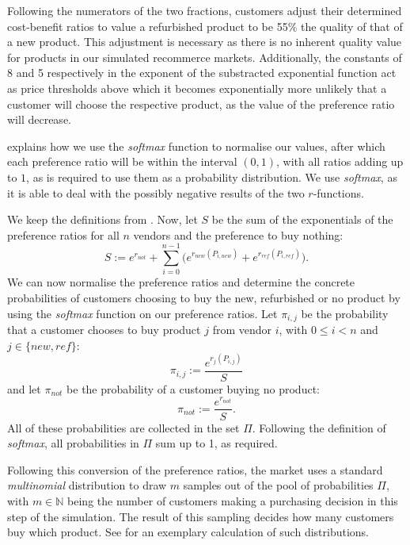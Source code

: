 Following the numerators of the two fractions, customers adjust their determined cost-benefit ratios to value a refurbished product to be 55\% the quality of that of a new product. This adjustment is necessary as there is no inherent quality value for products in our simulated recommerce markets. Additionally, the constants of 8 and 5 respectively in the exponent of the substracted exponential function act as price thresholds above which it becomes exponentially more unlikely that a customer will choose the respective product, as the value of the preference ratio will decrease.

 explains how we use the \emph{softmax} function to normalise our values, after which each preference ratio will be within the interval \((0,1)\), with all ratios adding up to \(1\), as is required to use them as a probability distribution. We use \emph{softmax}, as it is able to deal with the possibly negative results of the two \(r\)-functions.

\begin{definition}\label{def:customerSoftmax}
	We keep the definitions from . Now, let \(S\) be the sum of the exponentials of the preference ratios for all \(n\) vendors and the preference to buy nothing:
	\begin{equation}\label{eq:PrefSum}
		S := e^{r_{not}} + \sum_{i=0}^{n-1}\biggl(e^{r_{new}(P_{i, new})}+e^{r_{ref}(P_{i, ref})}\biggr).
	\end{equation}
	We can now normalise the preference ratios and determine the concrete probabilities of customers choosing to buy the new, refurbished or no product by using the \emph{softmax} function on our preference ratios. Let \(\pi_{i, j}\) be the probability that a customer chooses to buy product \(j\) from vendor \(i\), with \(0 \leq i < n\) and \(j \in \{new, ref\}\):
	\begin{equation}\label{eq:Softmax}
		\pi_{i, j} := \frac{e^{r_{j}(P_{i, j})}}{S}
	\end{equation}
	and let \(\pi_{not}\) be the probability of a customer buying no product:
	\begin{equation}
		\pi_{not} := \frac{e^{r_{not}}}{S}.
	\end{equation}
	All of these probabilities are collected in the set \(\Pi\). Following the definition of \emph{softmax}, all probabilities in \(\Pi\) sum up to 1, as required.
\end{definition}

Following this conversion of the preference ratios, the market uses a standard \emph{multinomial} distribution to draw \(m\) samples out of the pool of probabilities \(\Pi\), with \(m \in \mathbb{N}\) being the number of customers making a purchasing decision in this step of the simulation. The result of this sampling decides how many customers buy which product. See  for an exemplary calculation of such distributions.

